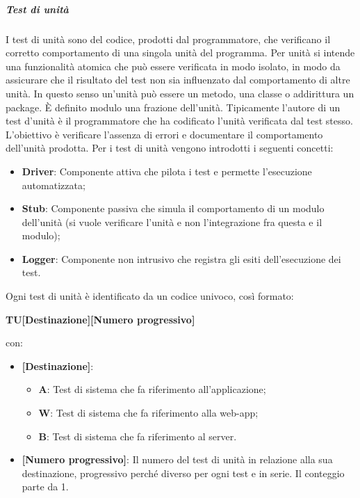 \subparagraph*{Test di unità} 
I test di unità sono del codice, prodotti dal programmatore, che verificano il corretto comportamento di una singola unità del programma.
Per unità si intende una funzionalità atomica che può essere verificata in modo isolato, in modo da assicurare che il risultato del test non sia influenzato dal comportamento di altre unità. In questo senso un'unità può essere un metodo, una classe o addirittura un package.
È definito modulo una frazione dell'unità.
Tipicamente l'autore di un test d'unità è il programmatore che ha codificato l'unità verificata dal test stesso.
L'obiettivo è verificare l’assenza di errori e documentare il comportamento dell’unità prodotta.
Per i test di unità vengono introdotti i seguenti concetti:
\begin{itemize}
    \item \textbf{Driver}: Componente attiva che pilota i test e permette l'esecuzione automatizzata;
    \item \textbf{Stub}: Componente passiva che simula il comportamento di un modulo dell'unità (si vuole verificare l'unità e non l'integrazione fra questa e il modulo);
    \item \textbf{Logger}: Componente non intrusivo che registra gli esiti dell'esecuzione dei test.
\end{itemize}
Ogni test di unità è identificato da un codice univoco, così formato:
\begin{center}
	\item \textbf{TU[Destinazione][Numero progressivo]}
\end{center}
con:
\begin{itemize}
	\item \textbf{[Destinazione]}:
	\begin{itemize}
		\item \textbf{A}: Test di sistema che fa riferimento all'applicazione;
		\item \textbf{W}: Test di sistema che fa riferimento alla web-app;
		\item \textbf{B}: Test di sistema che fa riferimento al server.
	\end{itemize}
	\item \textbf{[Numero progressivo]}: Il numero del test di unità in relazione alla sua destinazione, progressivo perché diverso per ogni test e in serie. Il conteggio parte da 1.
\end{itemize}


